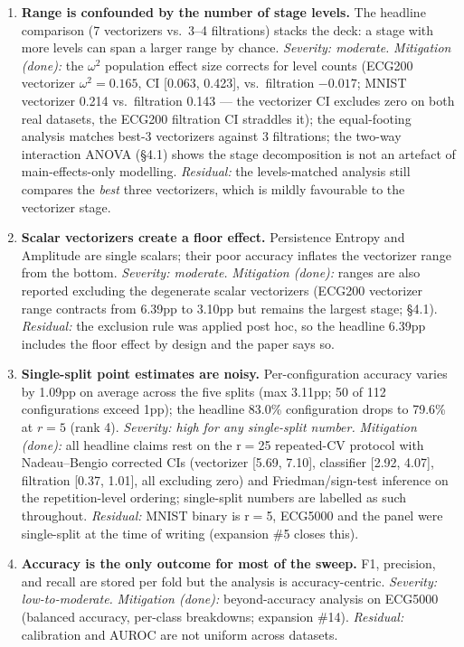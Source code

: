 \begin{enumerate}
  \item \textbf{Range is confounded by the number of stage levels.} The
    headline comparison (7 vectorizers vs.\ 3--4 filtrations) stacks the deck:
    a stage with more levels can span a larger range by chance. \emph{Severity:
    moderate.} \emph{Mitigation (done):} the $\omega^2$ population effect size
    corrects for level counts (ECG200 vectorizer $\omega^2{=}0.165$, CI
    [0.063, 0.423], vs.\ filtration $-0.017$; MNIST vectorizer 0.214 vs.\
    filtration 0.143 --- the vectorizer CI excludes zero on both real datasets,
    the ECG200 filtration CI straddles it); the equal-footing analysis matches
    best-3 vectorizers against 3 filtrations; the two-way interaction ANOVA
    (\S4.1) shows the stage decomposition is not an artefact of
    main-effects-only modelling. \emph{Residual:} the levels-matched analysis
    still compares the \emph{best} three vectorizers, which is mildly
    favourable to the vectorizer stage.
  \item \textbf{Scalar vectorizers create a floor effect.} Persistence Entropy
    and Amplitude are single scalars; their poor accuracy inflates the
    vectorizer range from the bottom. \emph{Severity: moderate.}
    \emph{Mitigation (done):} ranges are also reported excluding the
    degenerate scalar vectorizers (ECG200 vectorizer range contracts from
    6.39pp to 3.10pp but remains the largest stage; \S4.1). \emph{Residual:}
    the exclusion rule was applied post hoc, so the headline 6.39pp includes
    the floor effect by design and the paper says so.
  \item \textbf{Single-split point estimates are noisy.} Per-configuration
    accuracy varies by 1.09pp on average across the five splits (max 3.11pp;
    50 of 112 configurations exceed 1pp); the headline 83.0\% configuration
    drops to 79.6\% at $r{=}5$ (rank 4). \emph{Severity: high for any
    single-split number.} \emph{Mitigation (done):} all headline claims rest
    on the r$=$25 repeated-CV protocol with Nadeau--Bengio corrected CIs
    (vectorizer [5.69, 7.10], classifier [2.92, 4.07], filtration [0.37,
    1.01], all excluding zero) and Friedman/sign-test inference on the
    repetition-level ordering; single-split numbers are labelled as such
    throughout. \emph{Residual:} MNIST binary is r$=$5, ECG5000 and the panel
    were single-split at the time of writing (expansion \#5 closes this).
  \item \textbf{Accuracy is the only outcome for most of the sweep.} F1,
    precision, and recall are stored per fold but the analysis is
    accuracy-centric. \emph{Severity: low-to-moderate.} \emph{Mitigation
    (done):} beyond-accuracy analysis on ECG5000 (balanced accuracy, per-class
    breakdowns; expansion \#14). \emph{Residual:} calibration and AUROC are
    not uniform across datasets.
\end{enumerate}

